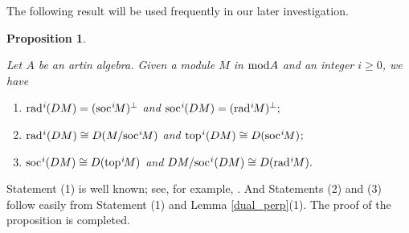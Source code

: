 \documentclass[10pt]{amsart}
\newtheorem{Prop}[Theo]{Proposition}
\newtheorem{Cor}[Theo]{Corollary}
\theoremstyle{definition}
\newcommand{\mmod}{{\rm mod}}
\newcommand{\rad}{{\rm rad}\hspace{.5pt}}
\newcommand{\soc}{{\rm soc}\hspace{.5pt}}
\newcommand{\ntop}{{\rm top}\hspace{.5pt}}
\newcommand{\hp}{\hspace{.5pt}}
\newcommand{\vp}{\vspace{.5pt}}
\begin{document}
\smallskip

The following result will be used frequently in our later investigation.

\begin{Prop}\label{duality_radi_soci}

Let $A$ be an artin algebra. Given a module $M$ in $\mmod A$ and an integer $i\ge 0$, we have 

\begin{enumerate}[$(1)$]

\vspace{-1pt}

\item  $\rad^i\hspace{-.5pt}(DM)=(\soc^i\hspace{-1.5pt}M)^\perp$  and $\soc^i\hspace{-.5pt}(DM)=(\rad^i\hspace{-1.2pt}M)^\perp;$

\vp

\item $\rad^i(DM)\cong D(M /\soc^i \hspace{-1.2pt} M)$ and $\ntop^i(DM)\cong D(\soc^i \hspace{-1.2pt} M)\hp;$

\vp
\item $\soc^i(DM)\cong D(\ntop^i\hspace{-1.2pt}M)$ and $DM/\soc^i(DM)\cong D(\rad^i\hspace{-1.2pt}M).$

\end{enumerate} \end{Prop}

 Statement (1) is well known; see, for example, \cite[Chapter 6, Exercise 7]{Webb}. And
Statements (2) and (3) follow easily from Statement (1) and Lemma \ref{dual_perp}(1). The proof of the proposition is completed. 





\end{document}
